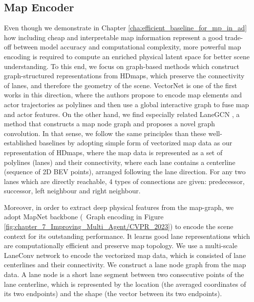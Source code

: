 \subsection{Map Encoder}
\label{subsec:7_improving_efficiency_map_preprocessing_and_encoding}

Even though we demonstrate in Chapter \ref{cha:efficient_baseline_for_mp_in_ad} how including cheap and interpretable map information represent a good trade-off between model accuracy and computational complexity, more powerful map encoding is required to compute an enriched physical latent space for better scene understanding. To this end, we focus on graph-based methods \cite{zeng2021lanercnn} which construct graph-structured representations from \acp{HDmap}, which preserve the connectivity of lanes, and therefore the geometry of the scene. VectorNet \cite{gao2020vectornet} is one of the first works in this direction, where the authors propose to encode map elements and actor trajectories as polylines and then use a global interactive graph to fuse map and actor features. On the other hand, we find especially related LaneGCN \cite{liang2020learning}, a method that constructs a map node graph and proposes a novel graph convolution. In that sense, we follow the same principles than these well-established baselines by adopting simple form of vectorized map data as our representation of \acp{HDmap}, where the map data is represented as a set of polylines (lanes) and their connectivity, where each lane contains a centerline (sequence of 2D \ac{BEV} points), arranged following the lane direction. For any two lanes which are directly reachable, 4 types of connections are given: predecessor, successor, left neighbour and right neighbour.

Moreover, in order to extract deep physical features from the map-graph, we adopt MapNet \cite{liang2020learning} backbone (\ie \ Graph encoding in Figure \ref{fig:chapter_7_Improving_Multi_Agent/CVPR_2023}) to encode the scene context for its outstanding performance. It learns good lane representations which are computationally efficient and preserve map topology. We use a multi-scale LaneConv network to encode the vectorized map data, which is consisted of lane centerlines and their connectivity. We construct a lane node graph from the map data. A lane node is a short lane segment between two consecutive points of the lane centerline, which is represented by the location (the averaged coordinates of its two endpoints) and the shape (the vector between its two endpoints). 

